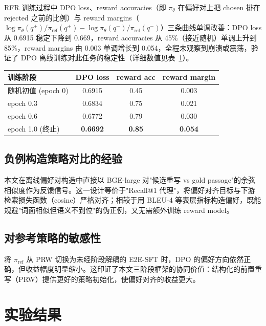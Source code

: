 RFR 训练过程中 DPO loss、reward accuracies（即 $\pi_\theta$ 在偏好对上把 chosen 排在 rejected 之前的比例）与 reward margins（$\log\pi_\theta(q^+)/\pi_{\text{ref}}(q^+) - \log\pi_\theta(q^-)/\pi_{\text{ref}}(q^-)$）三条曲线单调改善：DPO loss 从 0.6915 稳定下降到 0.669，reward accuracies 从 45\%（接近随机）单调上升到 85\%，reward margins 由 0.003 单调增长到 0.054，全程未观察到崩溃或震荡，验证了 DPO 离线训练对此任务的稳定性（详细数值见表~\ref{tab:rfr_curve}）。

\begin{table}[h]
\centering
{}
\label{tab:rfr_curve}
\begin{tabular}{lccc}
\toprule
训练阶段 & DPO loss & reward acc & reward margin \\
\midrule
随机初值 (epoch 0) & 0.6915 & 0.45 & 0.003 \\
epoch 0.3          & 0.6834 & 0.75 & 0.021 \\
epoch 0.6          & 0.6772 & 0.79 & 0.030 \\
epoch 1.0 (终止)   & \textbf{0.6692} & \textbf{0.85} & \textbf{0.054} \\
\bottomrule
\end{tabular}
\end{table}

\subsection{负例构造策略对比的经验}

本文在离线偏好对构造中直接以 BGE-large 对"候选重写 vs gold passage"的余弦相似度作为反馈信号。这一设计等价于"Recall@1 代理"，将偏好对齐目标与下游检索损失函数（cosine）严格对齐；相较于用 BLEU-4 等表层指标构造偏好，既能规避"词面相似但语义不到位"的伪正例，又无需额外训练 reward model。

\subsection{对参考策略的敏感性}

将 $\pi_{\text{ref}}$ 从 PRW 切换为未经阶段解耦的 E2E-SFT 时，DPO 的偏好方向依然正确，但收益幅度明显缩小。这印证了本文三阶段框架的协同价值：结构化的前置重写（PRW）提供更好的策略初始化，使偏好对齐的收益更大。

\section{实验结果}
\label{sec:rfr_exp}

